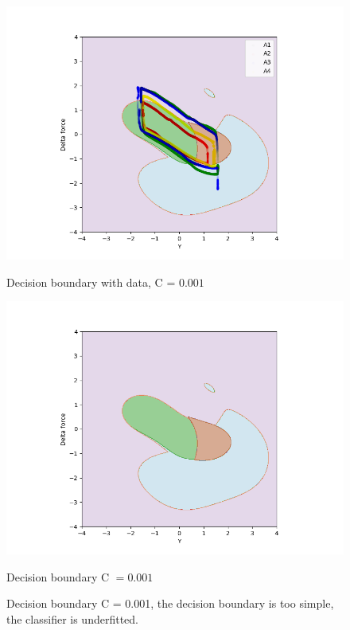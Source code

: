         
            \begin{figure}[]
                \begin{minipage}[b]{0.5\linewidth}
                    \centering
                    \includegraphics[width = 1.2\textwidth]{figures/analysis/svm/SVM_servo_C0001.png}
                    \caption*{Decision boundary with data, C = $0.001$}
                \end{minipage}
                \hfill
                \begin{minipage}[b]{0.5\linewidth}
                    \centering
                    \includegraphics[width = 1.2\textwidth]{figures/analysis/svm/SVM_servo_C0001countour.png}
                    \caption*{Decision boundary  C $= 0.001$}
                \end{minipage}
                \caption{Decision boundary C = 0.001, the decision boundary is too simple, the classifier is underfitted.}
                \label{fig:svm_undefit_servo}
            \end{figure}
        
